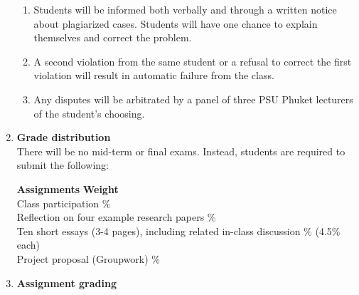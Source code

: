 \documentclass[a4paper,12pt]{article}
\begin{document}
\begin{enumerate}[label=\textbf{\Alph*}]
        \begin{enumerate}
            \item Students will be informed both verbally and through a written notice about plagiarized cases. Students will have one chance to explain themselves and correct the problem.
            \item A second violation from the same student or a refusal to correct the first violation will result in automatic failure from the class.
            \item Any disputes will be arbitrated by a panel of three PSU Phuket lecturers of the student's choosing.
        \end{enumerate}
    \item \textbf{Grade distribution} \hfill \\
    There will be no mid-term or final exams. Instead, students are required to submit the following:
        \begin{tabbing}
            \textbf{Assignments} \hspace{10cm} \=\textbf{Weight} \\
            Class participation \% \\
            Reflection on four example research papers \% \\
            Ten short essays (3-4 pages), including related in-class discussion  \% (4.5\% each) \\
            Project proposal (Groupwork) \% \\
        \end{tabbing}
   \item \textbf{Assignment grading} \hfill \\
        
\end{enumerate}
\end{document}
